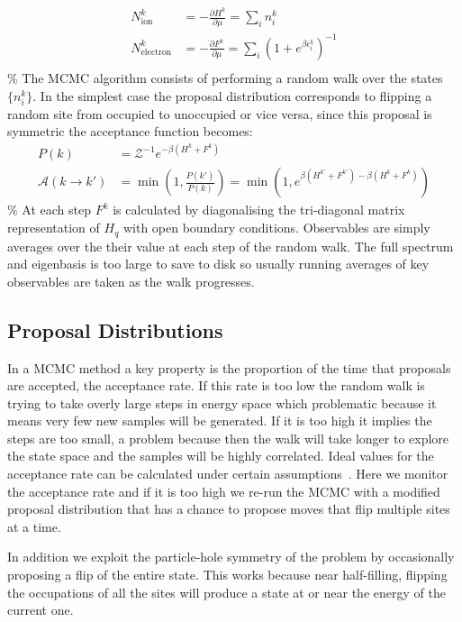 \[\begin{aligned}
N^k_{\mathrm{ion}} &= - \frac{\partial H^k}{\partial \mu} = \sum_i n^k_i\\
N^k_{\mathrm{electron}} &= - \frac{\partial F^k}{\partial \mu} = \sum_i \left(1 + e^{\beta \epsilon^k_i}\right)^{-1}\\
\end{aligned}\] \% The MCMC algorithm consists of performing a random walk over the states \(\{ n^k_i \}\). In the simplest case the proposal distribution corresponds to flipping a random site from occupied to unoccupied or vice versa, since this proposal is symmetric the acceptance function becomes: \[\begin{aligned} 
P(k) &= \mathcal{Z}^{-1} e^{-\beta(H^k + F^k)} \\
\mathcal{A}(k \to k') &= \min\left(1, \frac{P(k')}{P(k)}\right) = \min\left(1, e^{\beta(H^{k'} + F^{k'})-\beta(H^k + F^k)}\right)
\end{aligned}\] \% At each step \(F^k\) is calculated by diagonalising the tri-diagonal matrix representation of \(H_q\) with open boundary conditions. Observables are simply averages over the their value at each step of the random walk. The full spectrum and eigenbasis is too large to save to disk so usually running averages of key observables are taken as the walk progresses.

\hypertarget{proposal-distributions}{%
\subsection{Proposal Distributions}\label{proposal-distributions}}

In a MCMC method a key property is the proportion of the time that proposals are accepted, the acceptance rate. If this rate is too low the random walk is trying to take overly large steps in energy space which problematic because it means very few new samples will be generated. If it is too high it implies the steps are too small, a problem because then the walk will take longer to explore the state space and the samples will be highly correlated. Ideal values for the acceptance rate can be calculated under certain assumptions~\autocite{robertsWeakConvergenceOptimal1997}. Here we monitor the acceptance rate and if it is too high we re-run the MCMC with a modified proposal distribution that has a chance to propose moves that flip multiple sites at a time.

In addition we exploit the particle-hole symmetry of the problem by occasionally proposing a flip of the entire state. This works because near half-filling, flipping the occupations of all the sites will produce a state at or near the energy of the current one.

